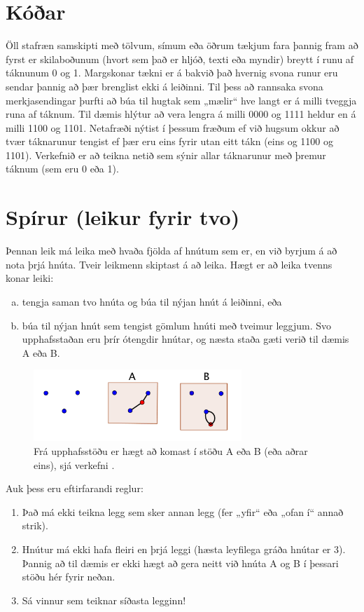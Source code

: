 \documentclass[b5paper,12pt]{book}
\renewcommand*\thesection{\arabic{section}}
\begin{document}
\section{Kóðar}
Öll stafræn samskipti með tölvum, símum eða öðrum tækjum fara þannig fram að fyrst er skilaboðunum (hvort sem það er hljóð, texti eða myndir) breytt í runu af táknunum 0 og 1. Margskonar tækni er á bakvið það hvernig svona runur eru sendar þannig að þær brenglist ekki á leiðinni. Til þess að rannsaka svona merkjasendingar þurfti að búa til hugtak sem „mælir“ hve langt er á milli tveggja runa af táknum. Til dæmis hlýtur að vera lengra á milli 0000 og 1111 heldur en á milli 1100 og 1101. Netafræði nýtist í þessum fræðum ef við hugsum okkur að tvær táknarunur tengist ef þær eru eins fyrir utan eitt tákn (eins og 1100 og 1101). Verkefnið er að teikna netið sem sýnir allar táknarunur með þremur táknum (sem eru 0 eða 1).

\section{Spírur (leikur fyrir tvo)}
Þennan leik má leika með hvaða fjölda af hnútum sem er, en við byrjum á að nota þrjá hnúta. Tveir leikmenn skiptast á að leika. Hægt er að leika tvenns konar leiki:
\begin{enumerate}[(a)]
\item tengja saman tvo hnúta og búa til nýjan hnút á leiðinni, eða
\item búa til nýjan hnút sem tengist gömlum hnúti með tveimur leggjum.
Svo upphafsstaðan eru þrír ótengdir hnútar, og næsta staða gæti verið til dæmis A eða B.
\end{enumerate}

\begin{figure}[h]
  \includegraphics[width=0.7\textwidth, center]{Sprouts1.png}
  \caption*{Frá upphafsstöðu er hægt að komast í stöðu A eða B (eða aðrar eins), sjá verkefni \thesection{}.}
\end{figure}

Auk þess eru eftirfarandi reglur: 
\begin{enumerate}
\item Það má ekki teikna legg sem sker annan legg (fer „yfir“ eða „ofan í“ annað strik). 
\item Hnútur má ekki hafa fleiri en þrjá leggi (hæsta leyfilega gráða hnútar er 3). Þannig að til dæmis er ekki hægt að gera neitt við hnúta A og B í þessari stöðu hér fyrir neðan.
\item Sá vinnur sem teiknar síðasta legginn!
\end{enumerate}
\end{document}
